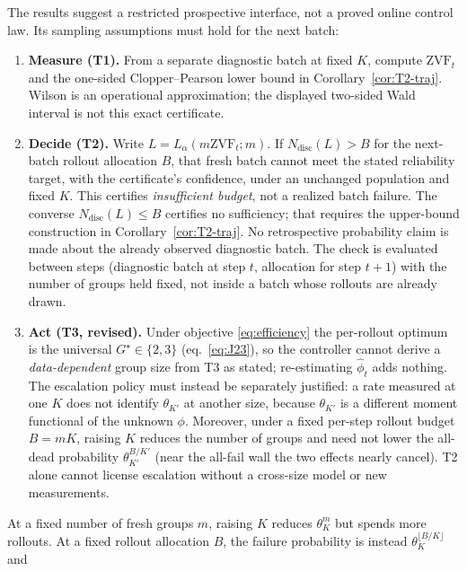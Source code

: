 \documentclass[11pt]{article}
\theoremstyle{plain}
\theoremstyle{definition}
\theoremstyle{remark}
\newcommand{\ZVF}{\ensuremath{\mathrm{ZVF}}}
\newcommand{\1}{\mathbb{1}}
\begin{document}
The results suggest a restricted prospective interface, not a proved online
control law. Its sampling assumptions must hold for the next batch:
\begin{enumerate}[leftmargin=1.5em,itemsep=2pt]
  \item \textbf{Measure (T1).} From a separate diagnostic batch at fixed $K$,
        compute $\ZVF_t$ and the one-sided Clopper--Pearson lower bound in
        Corollary~\ref{cor:T2-traj}. Wilson is an operational approximation;
        the displayed two-sided Wald interval is not this exact certificate.
  \item \textbf{Decide (T2).} Write $L=L_\alpha(m\ZVF_t;m)$. If
        $N_{\mathrm{disc}}(L)>B$ for the next-batch rollout allocation $B$,
        that fresh batch cannot meet the stated reliability target, with the
        certificate's confidence, under an unchanged population and fixed $K$.
        This certifies \emph{insufficient budget}, not a realized batch failure.
        The converse $N_{\mathrm{disc}}(L)\le B$ certifies no sufficiency;
        that requires the upper-bound construction in
        Corollary~\ref{cor:T2-traj}. No retrospective probability claim is
        made about the already observed diagnostic batch. The check is
        evaluated between steps (diagnostic batch at step $t$, allocation for
        step $t{+}1$) with the number of groups held fixed, not inside a batch
        whose rollouts are already drawn.
  \item \textbf{Act (T3, revised).} Under objective \eqref{eq:efficiency}
        the per-rollout optimum is the universal $G^\star\in\{2,3\}$
        (eq.~\ref{eq:J23}), so the controller cannot derive a
        \emph{data-dependent} group size from T3 as stated; re-estimating
        $\widehat\phi_t$ adds nothing. The escalation policy must instead
        be separately justified: a rate measured at one $K$ does not identify
        $\theta_{K'}$ at another size, because $\theta_{K'}$ is a different
        moment functional of the unknown $\phi$. Moreover, under a fixed
        per-step rollout budget $B=mK$, raising $K$ reduces the number of groups
        and need not lower the all-dead probability $\theta_{K'}^{B/K'}$
        (near the all-fail wall the two effects nearly cancel). T2 alone
        cannot license escalation without a cross-size model or new
        measurements.
\end{enumerate}
At a fixed number of fresh groups $m$, raising $K$ reduces
$\theta_K^m$ but spends more rollouts. At a fixed rollout allocation $B$,
the failure probability is instead $\theta_K^{\lfloor B/K\rfloor}$ and
\end{document}
